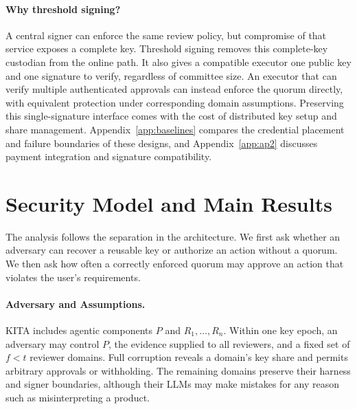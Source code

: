 \documentclass{article}
\begin{document}
\paragraph{Why threshold signing?}
A central signer can enforce the same review policy, but compromise of that
service exposes a complete key. Threshold signing removes this complete-key
custodian from the online path. It also gives a compatible executor one
public key and one signature to verify, regardless of committee size.
An executor that can verify multiple authenticated approvals can instead
enforce the quorum directly, with equivalent protection under corresponding
domain assumptions. Preserving this single-signature interface comes with the cost of distributed
key setup and share management. Appendix~\ref{app:baselines} compares the
credential placement and failure boundaries of these designs, and
Appendix~\ref{app:ap2} discusses payment integration and signature compatibility.



\section{Security Model and Main Results}
\label{sec:security}
The analysis follows the separation in the architecture. We first ask whether
an adversary can recover a reusable key or authorize an action without a
quorum. We then ask how often a correctly enforced quorum may approve an
action that violates the user's requirements.

\paragraph{Adversary and Assumptions.}
\textsf{KITA} includes agentic components $P$ and $R_1,\ldots, R_n$. Within one key epoch, an adversary may control $P$, the
evidence supplied to all reviewers, and a fixed set of $f<t$ reviewer domains.
Full corruption reveals a domain's key share and permits arbitrary approvals
or withholding. The remaining domains preserve their harness and signer
boundaries, although their LLMs may make mistakes for any reason such as misinterpreting a product.
\end{document}

